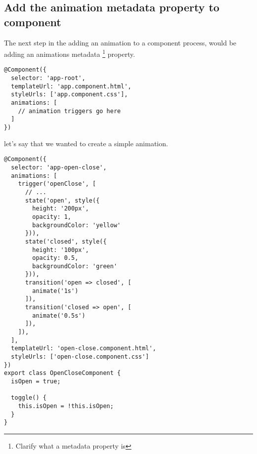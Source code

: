 \subsection{Add the animation metadata property to component}
The next step in the adding an animation to a component process, would be 
adding an animations metadata \footnote{Clarify what a metadata property is}
property.

\begin{lstlisting}
@Component({
  selector: 'app-root',
  templateUrl: 'app.component.html',
  styleUrls: ['app.component.css'],
  animations: [
    // animation triggers go here
  ]
})  
\end{lstlisting}

let's say that we wanted to create a simple animation. 

\begin{lstlisting}
@Component({
  selector: 'app-open-close',
  animations: [
    trigger('openClose', [
      // ...
      state('open', style({
        height: '200px',
        opacity: 1,
        backgroundColor: 'yellow'
      })),
      state('closed', style({
        height: '100px',
        opacity: 0.5,
        backgroundColor: 'green'
      })),
      transition('open => closed', [
        animate('1s')
      ]),
      transition('closed => open', [
        animate('0.5s')
      ]),
    ]),
  ],
  templateUrl: 'open-close.component.html',
  styleUrls: ['open-close.component.css']
})
export class OpenCloseComponent {
  isOpen = true;

  toggle() {
    this.isOpen = !this.isOpen;
  }
}
\end{lstlisting}